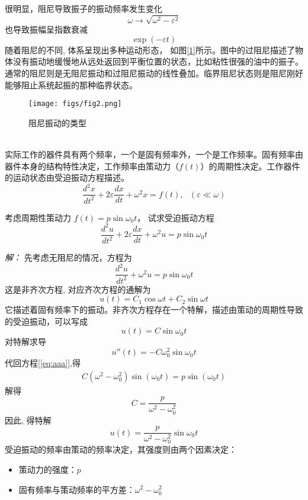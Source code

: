 很明显，阻尼导致振子的振动频率发生变化
$$ \omega \to \sqrt{\omega ^2 - \varepsilon ^2} $$
也导致振幅呈指数衰减 $$ \exp(-\varepsilon t) $$ 随着阻尼的不同, 体系呈现出多种运动形态， 如图[\ref{fig:damp}]所示。图中的过阻尼描述了物体没有振动地缓慢地从远处返回到平衡位置的状态，比如粘性很强的油中的振子。通常的阻尼则是无阻尼振动和过阻尼振动的线性叠加。临界阻尼状态则是阻尼刚好能够阻止系统起振的那种临界状态。
\begin{figure}[htbp]
	\centering
	\texttt{[image: figs/fig2.png]}
	\caption{阻尼振动的类型}
	\label{fig:damp}
\end{figure}
~~\\ 

实际工作的器件具有两个频率，一个是固有频率外，一个是工作频率。固有频率由器件本身的结构特性决定，工作频率由策动力（$f(t)$）的周期性决定。工作器件的运动状态由受迫振动方程描述。
\begin{equation}
    \frac{d^2 x}{d t^2} +2\varepsilon \frac{d x}{dt} +\omega ^2 x = f(t),  ~~~ (\varepsilon \ll \omega)   
\end{equation}
\begin{example} 
	考虑周期性策动力 $f(t)= p \sin \omega_0 t$， 试求受迫振动方程
\begin{equation*}
    \frac{d^2 u}{d t^2} +2\varepsilon \frac{d x}{dt}+\omega ^2 u = p \sin \omega_0 t    
  \end{equation*} 
\end{example}
\emph{解：}
先考虑无阻尼的情况，方程为
\begin{equation}\label{eq:aaa}
    \frac{d^2 u}{d t^2} +\omega ^2 u = p \sin \omega_0 t    
  \end{equation} 
这是非齐次方程, 对应齐次方程的通解为
\begin{equation*}
	u(t)=C_1 \cos \omega t +C_2 \sin \omega t 
	\end{equation*}
它描述着固有频率下的振动。非齐次方程存在一个特解，描述由策动的周期性导致的受迫振动，可以写成 \\
	$$ u(t) =C \sin \omega_0 t $$
对特解求导
	$$ u''(t) = - C \omega_0 ^2 \sin \omega_0 t $$
代回方程[\ref{eq:aaa}],得
	$$ \begin{aligned}
	  C(\omega^2-\omega_{0} ^2 ) \sin(\omega_0 t) =p\sin(\omega_0 t)
	\end{aligned}  $$
解得 $$C = \frac{p}{\omega^2-\omega_{0} ^2 }  $$ 
因此, 得特解 $$ u(t) =\frac{p}{\omega^2-\omega_{0} ^2 } \sin \omega_0 t $$
受迫振动的频率由策动的频率决定，其强度则由两个因素决定：
\begin{itemize}
	\item 策动力的强度：$p$
	\item 固有频率与策动频率的平方差：$\omega^2-\omega_{0} ^2$ 
\end{itemize}


